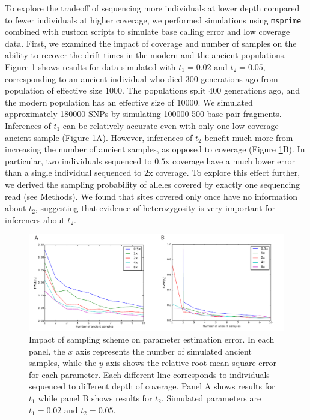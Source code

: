\documentclass[11pt, oneside]{article}   	%
\begin{document}
To explore the tradeoff of sequencing more individuals at lower depth compared to fewer individuals at higher coverage, we performed simulations using \texttt{msprime} \citep{kelleher2016efficient} combined with custom scripts to simulate base calling error and low coverage data. First, we examined the impact of coverage and number of samples on the ability to recover the drift times in the modern and the ancient populations. Figure \ref{RMSE} shows results for data simulated with $t_1 = 0.02$ and $t_2 = 0.05$, corresponding to an ancient individual who died $300$ generations ago from population of effective size $1000$. The populations split $400$ generations ago, and the modern population has an effective size of $10000$. We simulated approximately 180000 SNPs by simulating 100000 500 base pair fragments. Inferences of $t_1$ can be relatively accurate even with only one low coverage ancient sample (Figure \ref{RMSE}A). However, inferences of $t_2$ benefit much more from increasing the number of ancient samples, as opposed to coverage (Figure \ref{RMSE}B). In particular, two individuals sequenced to $0.5$x coverage have a much lower error than a single individual sequenced to $2$x coverage. To explore this effect further, we derived the sampling probability of alleles covered by exactly one sequencing read (see Methods). We found that sites covered only once have no information about $t_2$, suggesting that evidence of  heterozygosity is very important for inferences about $t_2$. 

\begin{figure}[h] %
   \centering
   \includegraphics[width=\textwidth]{RMSE_Figure.pdf} 
   \caption{Impact of sampling scheme on parameter estimation error. In each panel, the $x$ axis represents the number of simulated ancient samples, while the $y$ axis shows the relative root mean square error for each parameter. Each different line corresponds to individuals sequenced to different depth of coverage. Panel A shows results for $t_1$ while panel B shows results for $t_2$. Simulated parameters are $t_1 = 0.02$ and $t_2 = 0.05$.}
   \label{RMSE}
\end{figure}
\end{document}
